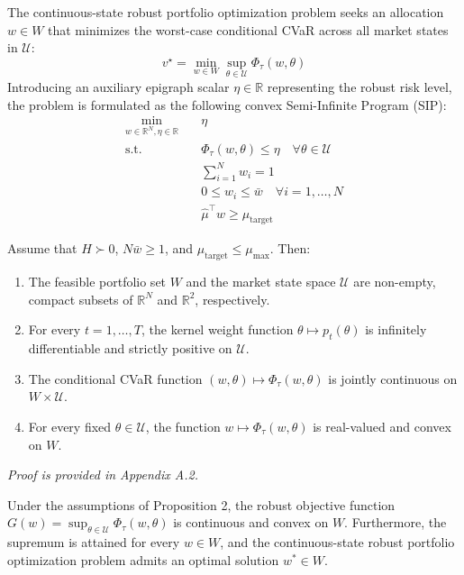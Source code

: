 \documentclass[smallextended]{svjour3}
\begin{document}
The continuous-state robust portfolio optimization problem seeks an allocation $w \in W$ that minimizes the worst-case conditional CVaR across all market states in $\mathcal{U}$:
\begin{equation}
    v^\star = \min_{w \in W} \sup_{\theta \in \mathcal{U}} \Phi_\tau(w, \theta)
\end{equation}
Introducing an auxiliary epigraph scalar $\eta \in \mathbb{R}$ representing the robust risk level, the problem is formulated as the following convex Semi-Infinite Program (SIP):
\begin{align}
    \min_{w \in \mathbb{R}^N, \eta \in \mathbb{R}} \quad & \eta \\
    \text{s.t.} \quad & \Phi_\tau(w, \theta) \le \eta \quad \forall \theta \in \mathcal{U} \\
    & \sum_{i=1}^N w_i = 1 \\
    & 0 \le w_i \le \bar{w} \quad \forall i=1,\dots,N \\
    & \hat{\mu}^\top w \ge \mu_{\text{target}}
\end{align}

\begin{proposition}
Assume that $H \succ 0$, $N\bar{w} \ge 1$, and $\mu_{\text{target}} \le \mu_{\max}$. Then:
\begin{enumerate}
    \item The feasible portfolio set $W$ and the market state space $\mathcal{U}$ are non-empty, compact subsets of $\mathbb{R}^N$ and $\mathbb{R}^2$, respectively.
    \item For every $t = 1, \dots, T$, the kernel weight function $\theta \mapsto p_t(\theta)$ is infinitely differentiable and strictly positive on $\mathcal{U}$.
    \item The conditional CVaR function $(w, \theta) \mapsto \Phi_\tau(w, \theta)$ is jointly continuous on $W \times \mathcal{U}$.
    \item For every fixed $\theta \in \mathcal{U}$, the function $w \mapsto \Phi_\tau(w, \theta)$ is real-valued and convex on $W$.
\end{enumerate}
\end{proposition}

\textit{Proof is provided in Appendix A.2.}


\begin{theorem}
Under the assumptions of Proposition 2, the robust objective function $G(w) = \sup_{\theta \in \mathcal{U}} \Phi_\tau(w, \theta)$ is continuous and convex on $W$. Furthermore, the supremum is attained for every $w \in W$, and the continuous-state robust portfolio optimization problem admits an optimal solution $w^* \in W$.
\end{theorem}
\end{document}
